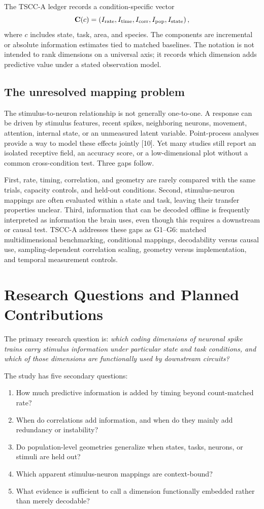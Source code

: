 \documentclass[conference]{IEEEtran}
\begin{document}
The TSCC-A ledger records a condition-specific vector
\begin{equation}
\mathbf C(c)=\left(I_{\rm rate},I_{\rm time},I_{\rm corr},I_{\rm pop},I_{\rm state}\right),
\end{equation}
where $c$ includes state, task, area, and species. The components are incremental or absolute information estimates tied to matched baselines. The notation is not intended to rank dimensions on a universal axis; it records which dimension adds predictive value under a stated observation model.

\subsection{The unresolved mapping problem}
The stimulus-to-neuron relationship is not generally one-to-one. A response can be driven by stimulus features, recent spikes, neighboring neurons, movement, attention, internal state, or an unmeasured latent variable. Point-process analyses provide a way to model these effects jointly [10]. Yet many studies still report an isolated receptive field, an accuracy score, or a low-dimensional plot without a common cross-condition test. Three gaps follow.

First, rate, timing, correlation, and geometry are rarely compared with the same trials, capacity controls, and held-out conditions. Second, stimulus-neuron mappings are often evaluated within a state and task, leaving their transfer properties unclear. Third, information that can be decoded offline is frequently interpreted as information the brain uses, even though this requires a downstream or causal test. TSCC-A addresses these gaps as G1--G6: matched multidimensional benchmarking, conditional mappings, decodability versus causal use, sampling-dependent correlation scaling, geometry versus implementation, and temporal measurement controls.

\section{Research Questions and Planned Contributions}
The primary research question is: \emph{which coding dimensions of neuronal spike trains carry stimulus information under particular state and task conditions, and which of those dimensions are functionally used by downstream circuits?}

The study has five secondary questions:
\begin{enumerate}
\item How much predictive information is added by timing beyond count-matched rate?
\item When do correlations add information, and when do they mainly add redundancy or instability?
\item Do population-level geometries generalize when states, tasks, neurons, or stimuli are held out?
\item Which apparent stimulus-neuron mappings are context-bound?
\item What evidence is sufficient to call a dimension functionally embedded rather than merely decodable?
\end{enumerate}
\end{document}
